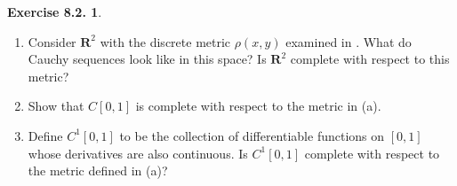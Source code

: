 \documentclass[12pt]{article}
\theoremstyle{definition}
\theoremstyle{exercise}
\newtheorem{exercise}{Exercise 8.2.}
\theoremstyle{solution}
\newcommand{\R}{\mathbf{R}}
\begin{document}
\begin{exercise}
\label{ex:5}
    \begin{enumerate}
        \item Consider \( \R^2 \) with the discrete metric \( \rho(x, y) \) examined in . What do Cauchy sequences look like in this space? Is \( \R^2 \) complete with respect to this metric?

        \item Show that \( C[0, 1] \) is complete with respect to the metric in  (a).

        \item Define \( C^1 [0, 1] \) to be the collection of differentiable functions on \( [0, 1] \) whose derivatives are also continuous. Is \( C^1 [0, 1] \) complete with respect to the metric defined in  (a)?
    \end{enumerate}
\end{exercise}
\end{document}
